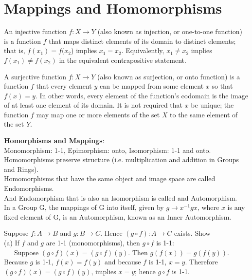 \section{Mappings and Homomorphisms}
\begin{definition}
An injective function $f: X\rightarrow Y$ (also known as injection, or one-to-one function) is a function $f$ that maps distinct elements of its domain to distinct elements; that is, $f(x_1) = f(x_2$) implies $x_1 = x_2$. 
Equivalently, $x_1 \ne x_2$ implies $f(x_1) \ne f(x_2)$ in the equivalent contrapositive statement.
\end{definition}

\begin{definition}
A surjective function  $f: X\rightarrow Y$ (also known as surjection, or onto function) is a function $f$ that every element $y$ can be mapped from some element $x$ so that $f(x) = y$. 
In other words, every element of the function's codomain is the image of at least one element of its domain. It is not required that $x$ be unique; the function $f$ 
may map one or more elements of the set $X$ to the same element of the set $Y$.
\end{definition}

\begin{definition}{\bf Homorphisms and Mappings}:\\
Monomorphism: 1-1, Epimorphism: onto, Isomorphism: 1-1 and onto.\\ Homomorphisms preserve structure (i.e. multiplication and addition in Groups and Rings). \\
Homomorphisms that have the same object and image space are called Endomorphisms.\\ And Endomorphism that is also an Isomorphism is called and Automorphism.\\
In a Group G, the mappings of G into itself, given by $g\rightarrow x^{-1} g x$, where $x$ is any fixed element of G, is an Automorphism, known as an Inner Automorphism.\\ 
\end{definition}

Suppose $f: A \rightarrow B$ and $g: B\rightarrow C$. Hence $(g\circ f) : A \rightarrow C$ exists. Show\\

(a) If $f$ and $g$ are 1-1 (monomorphisms), then $g\circ f$ is 1-1:\\
~~~Suppose $(g\circ f)(x) = (g\circ f)(y)$. Then $g(f(x)) = g(f(y))$. Because $g$ is 1-1, $f(x) = f(y)$ and because $f$ is 1-1, $x = y$. Therefore $(g\circ f)(x) = (g\circ f)(y)$, implies $x = y$; hence $g\circ f$ is 1-1. \\

